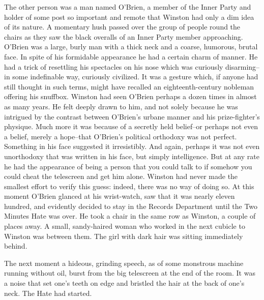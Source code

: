 \documentclass{article}
\begin{document}
The other person was a man named O'Brien, a member of the Inner Party and
holder of some post so important and remote that Winston had only a dim
idea of its nature. A momentary hush passed over the group of people
round the chairs as they saw the black overalls of an Inner Party member
approaching. O'Brien was a large, burly man with a thick neck and a coarse,
humorous, brutal face. In spite of his formidable appearance he had a
certain charm of manner. He had a trick of resettling his spectacles on
his nose which was curiously disarming--in some indefinable way, curiously
civilized. It was a gesture which, if anyone had still thought in such
terms, might have recalled an eighteenth-century nobleman offering his
snuffbox. Winston had seen O'Brien perhaps a dozen times in almost as many
years. He felt deeply drawn to him, and not solely because he was intrigued
by the contrast between O'Brien's urbane manner and his prize-fighter's
physique. Much more it was because of a secretly held belief--or perhaps
not even a belief, merely a hope--that O'Brien's political orthodoxy was
not perfect. Something in his face suggested it irresistibly. And again,
perhaps it was not even unorthodoxy that was written in his face, but
simply intelligence. But at any rate he had the appearance of being a
person that you could talk to if somehow you could cheat the telescreen and
get him alone. Winston had never made the smallest effort to verify this
guess: indeed, there was no way of doing so. At this moment O'Brien glanced
at his wrist-watch, saw that it was nearly eleven hundred, and evidently
decided to stay in the Records Department until the Two Minutes Hate was
over. He took a chair in the same row as Winston, a couple of places away.
A small, sandy-haired woman who worked in the next cubicle to Winston was
between them. The girl with dark hair was sitting immediately behind.

The next moment a hideous, grinding speech, as of some monstrous machine
running without oil, burst from the big telescreen at the end of the room.
It was a noise that set one's teeth on edge and bristled the hair at the
back of one's neck. The Hate had started.
\end{document}
